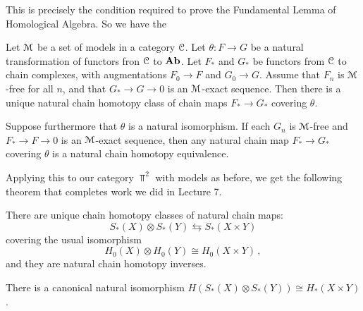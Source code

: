 This is precisely the condition required to prove the Fundamental Lemma
of Homological Algebra. So we have the 
\begin{theorem}
Let $\mathcal M$ be a set of models in a category $\mathcal C$. Let $\theta:F\to G$ be 
a natural transformation of functors fron $\mathcal C$ to $\mathbf{Ab}$. Let 
$F_*$ and $G_*$ be functors from $\mathcal C$ to chain complexes, with augmentations
$F_0\to F$ and $G_0\to G$. Assume that $F_n$ is $\mathcal M$-free for all $n$, and
that $G_*\to G\to0$ is an $\mathcal M$-exact sequence. Then there is a unique natural
chain homotopy class of chain maps $F_*\to G_*$ covering $\theta$. 
\end{theorem}
\begin{corollary}
Suppose furthermore that $\theta$ is a natural isomorphism. If
each $G_n$ is $\mathcal M$-free and $F_*\to F\to0$ is an $\mathcal M$-exact
sequence, then any natural chain map $F_*\to G_*$ covering $\theta$ is  
a natural chain homotopy equivalence. 
\end{corollary}

Applying this to our category $\Top^2$ with models as before, we get 
the following theorem that completes work we did in Lecture 7.
\begin{theorem}
There are unique chain homotopy classes of natural chain maps:
\begin{equation*}
S_\ast(X)\otimes S_\ast(Y)\leftrightarrows S_\ast(X\times Y)
\end{equation*}
covering the usual isomorphism
\[
H_0(X)\otimes H_0(Y)\cong H_0(X\times Y)\,,
\]
and they are natural chain homotopy inverses. 
\end{theorem}
\begin{corollary}
There is a canonical natural 
isomorphism $H(S_\ast(X)\otimes S_\ast(Y))\cong H_\ast(X\times Y)$.
\end{corollary}


